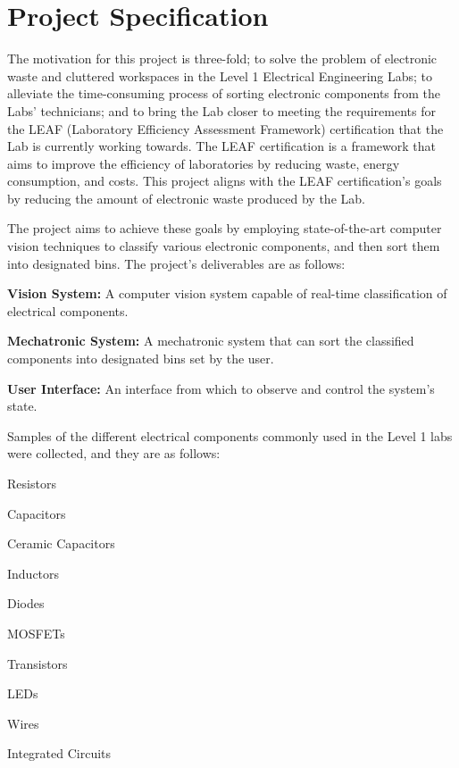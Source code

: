 \section{Project Specification}
\label{sec:project-specification}
The motivation for this project is three-fold; to solve the problem of electronic waste and cluttered workspaces in the Level 1 Electrical Engineering Labs; to alleviate the time-consuming process of sorting electronic components from the Labs' technicians; and to bring the Lab closer to meeting the requirements for the LEAF (Laboratory Efficiency Assessment Framework) certification \cite{leaf} that the Lab is currently working towards. The LEAF certification is a framework that aims to improve the efficiency of laboratories by reducing waste, energy consumption, and costs.
This project aligns with the LEAF certification's goals by reducing the amount of electronic waste produced by the Lab.

The project aims to achieve these goals by employing state-of-the-art computer vision techniques to classify various electronic components,
and then sort them into designated bins. The project's deliverables are as follows:
\begin{mylist}
  \item \textbf{Vision System:} A computer vision system capable of real-time classification of electrical components.
  \item \textbf{Mechatronic System:} A mechatronic system that can sort the classified components into designated bins set by the user.
  \item \textbf{User Interface:} An interface from which to observe and control the system's state.  
\end{mylist} 
\noindent
Samples of the different electrical components commonly used in the Level 1 labs were collected, and they are as follows:
\begin{multicols}{2}
  \begin{mylist}
    \item Resistors
    \item Capacitors
    \item Ceramic Capacitors
    \item Inductors
    \item Diodes
    \item MOSFETs
    \item Transistors
    \item LEDs
    \item Wires
    \item Integrated Circuits
  \end{mylist}
\end{multicols}


